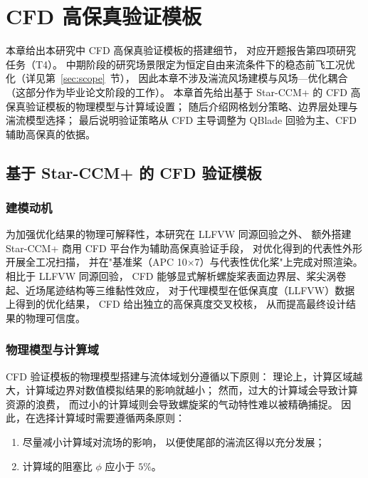 
\chapter{CFD 高保真验证模板}
\label{chap:wind_cfd}

本章给出本研究中 CFD 高保真验证模板的搭建细节，
对应开题报告第四项研究任务（T4）。
中期阶段的研究场景限定为恒定自由来流条件下的稳态前飞工况优化（详见第~\ref{sec:scope}~节），
因此本章不涉及湍流风场建模与风场—优化耦合（这部分作为毕业论文阶段的工作）。
本章首先给出基于 Star-CCM+ 的 CFD 高保真验证模板的物理模型与计算域设置；
随后介绍网格划分策略、边界层处理与湍流模型选择；
最后说明验证策略从 CFD 主导调整为 QBlade 回验为主、CFD 辅助高保真的依据。

\section{基于 Star-CCM+ 的 CFD 验证模板}

\subsection{建模动机}

为加强优化结果的物理可解释性，本研究在 LLFVW 同源回验之外、
额外搭建 Star-CCM+ 商用 CFD 平台作为辅助高保真验证手段，
对优化得到的代表性外形开展全工况扫描，
并在"基准桨（APC 10$\times$7）与代表性优化桨"上完成对照渲染。
相比于 LLFVW 同源回验，
CFD 能够显式解析螺旋桨表面边界层、桨尖涡卷起、近场尾迹结构等三维黏性效应，
对于代理模型在低保真度（LLFVW）数据上得到的优化结果，
CFD 给出独立的高保真度交叉校核，
从而提高最终设计结果的物理可信度。

\subsection{物理模型与计算域}

CFD 验证模板的物理模型搭建与流体域划分遵循以下原则：
理论上，计算区域越大，计算域边界对数值模拟结果的影响就越小；
然而，过大的计算域会导致计算资源的浪费，
而过小的计算域则会导致螺旋桨的气动特性难以被精确捕捉。
因此，在选择计算域时需要遵循两条原则：

\begin{enumerate}
  \item 尽量减小计算域对流场的影响，
        以便使尾部的湍流区得以充分发展；
  \item 计算域的阻塞比 $\phi$ 应小于 $5\%$。
\end{enumerate}

